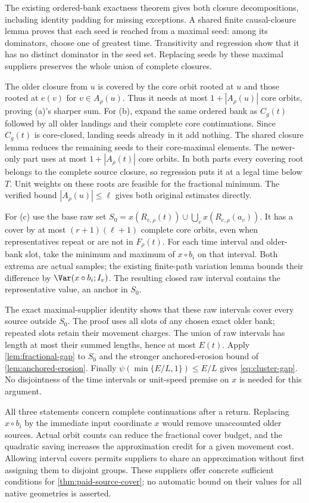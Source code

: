 \begin{outline}
The existing ordered-bank exactness theorem gives both closure
decompositions, including identity padding for missing exceptions.
A shared finite causal-closure lemma proves that each seed is reached
from a maximal seed: among its dominators, choose one of greatest time.
Transitivity and regression show that it has no distinct dominator in
the seed set. Replacing seeds by these maximal suppliers preserves the
whole union of complete closures.

The older closure from $u$ is covered by the core orbit rooted at $u$
and those rooted at $e(v)$ for $v\in A_\rho(u)$. Thus it needs at most
$1+|A_\rho(u)|$ core orbits, proving (a)'s sharper sum.
For (b), expand the same ordered bank as $C_g(t)$ followed by all older
landings and their complete core continuations. Since $C_g(t)$ is
core-closed, landing seeds already in it add nothing. The shared closure
lemma reduces the remaining seeds to their core-maximal elements.
The newer-only part uses at most $1+|A_\rho(t)|$ core orbits. In both
parts every covering root belongs to the complete source closure, so
regression puts it at a legal time below $T$. Unit weights on these
roots are feasible for the fractional minimum. The verified bound
$|A_\rho(u)|\le\ell$ gives both original estimates directly.

For (c) use the base raw set
$S_0=x(R_{e,\rho}(t))\cup\bigcup_v x(R_{e,\rho}(a_v))$.
It has a cover by at most $(r+1)(\ell+1)$ complete core orbits,
even when representatives repeat or are not in $F_\rho(t)$.
For each time interval and older-bank slot, take the minimum and maximum
of $x\circ b_i$ on that interval. Both extrema are actual samples;
the existing finite-path variation lemma bounds their difference by
$\Var(x\circ b_i;I_v)$. The resulting closed raw interval contains
the representative value, an anchor in $S_0$.

The exact maximal-supplier identity shows that these raw intervals
cover every source outside $S_0$. The proof uses all slots of any
chosen exact older bank; repeated slots retain their movement charges.
The union of raw intervals has length at most their summed lengths,
hence at most $E(t)$. Apply \cref{lem:fractional-gap} to $S_0$ and
the stronger anchored-erosion bound of \cref{lem:anchored-erosion}.
Finally $\psi(\min\{E/L,1\})\le E/L$ gives \cref{eq:cluster-gap}.
No disjointness of the time intervals or unit-speed premise on $x$ is
needed for this argument.
\end{outline}

All three statements concern complete continuations after a return.
Replacing $x\circ b_i$ by the immediate input coordinate $x$ would remove
unaccounted older sources. Actual orbit counts can reduce the fractional
cover budget, and the quadratic saving increases the approximation credit
for a given movement cost. Allowing interval covers permits suppliers to
share an approximation without first assigning them to disjoint groups.
These suppliers offer concrete sufficient
conditions for \cref{thm:paid-source-cover}; no automatic bound on their
values for all native geometries is asserted.
